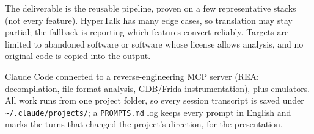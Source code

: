 \documentclass[10pt]{article}
\newcommand{\sect}[1]{\vspace{3pt}{\large\bfseries #1}\par\vspace{1pt}}
\begin{document}
\sect{Scope and risks}
The deliverable is the reusable pipeline, proven on a few representative stacks (not every feature).
HyperTalk has many edge cases, so translation may stay partial; the fallback is reporting which
features convert reliably. Targets are limited to abandoned software or software whose license
allows analysis, and no original code is copied into the output.

\sect{Tools and prompt history}
Claude Code connected to a reverse-engineering MCP server (REA: decompilation, file-format analysis,
GDB/Frida instrumentation), plus emulators. All work runs from one project folder, so every session
transcript is saved under \texttt{\textasciitilde/.claude/projects/}; a \texttt{PROMPTS.md} log keeps
every prompt in English and marks the turns that changed the project's direction, for the presentation.
\end{document}
